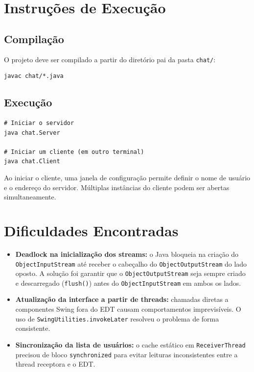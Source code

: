 \documentclass[10pt,twocolumn,a4paper]{article}
\begin{document}
\section{Instruções de Execução}

\subsection{Compilação}

O projeto deve ser compilado a partir do diretório pai da pasta \texttt{chat/}:

\begin{verbatim}
javac chat/*.java
\end{verbatim}

\subsection{Execução}

\begin{verbatim}
# Iniciar o servidor
java chat.Server

# Iniciar um cliente (em outro terminal)
java chat.Client
\end{verbatim}

Ao iniciar o cliente, uma janela de configuração permite definir o nome de
usuário e o endereço do servidor. Múltiplas instâncias do cliente podem ser
abertas simultaneamente.


\section{Dificuldades Encontradas}
\label{sec:dificuldades}

\begin{itemize}
    \item \textbf{Deadlock na inicialização dos streams:} o Java bloqueia na
          criação do \texttt{ObjectInputStream} até receber o cabeçalho do
          \texttt{ObjectOutputStream} do lado oposto. A solução foi garantir
          que o \texttt{ObjectOutputStream} seja sempre criado e descarregado
          (\texttt{flush()}) antes do \texttt{ObjectInputStream} em ambos os
          lados.

    \item \textbf{Atualização da interface a partir de threads:} chamadas
          diretas a componentes Swing fora do EDT causam comportamentos
          imprevisíveis. O uso de \texttt{SwingUtilities.invokeLater} resolveu
          o problema de forma consistente.

    \item \textbf{Sincronização da lista de usuários:} o cache estático em
          \texttt{ReceiverThread} precisou de bloco \texttt{synchronized} para
          evitar leituras inconsistentes entre a thread receptora e o EDT.
\end{itemize}
\end{document}
